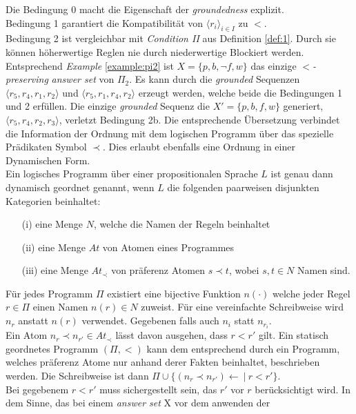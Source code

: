 Die Bedingung 0 macht die Eigenschaft der \emph{groundedness} explizit.\\
Bedingung 1 garantiert die Kompatibilität von $\langle r_i \rangle_{i \in I}$
zu $<$.\\
Bedingung 2 ist vergleichbar mit \emph{Condition II} aus Definition \ref{def:1}.
Durch sie können höherwertige Reglen nie durch niederwertige Blockiert werden.\\
Entsprechend \emph{Example} \ref{example:pi2} ist $X = \{p, b, \neg f, w\}$ das
einzige \emph{$<$-preserving} \emph{answer set} von $\Pi_2$. Es kann durch die 
\emph{grounded} Sequenzen
$\langle r_5, r_4, r_1, r_2 \rangle$ und $\langle r_5, r_1, r_4, r_2 \rangle$
erzeugt werden, welche beide die Bedingungen 1 und 2 erfüllen.
Die einzige \emph{grounded} Sequenz die $X' = \{p, b, f, w\}$ generiert,
$\langle r_5, r_4, r_2, r_3 \rangle$, verletzt Bedingung 2b.
Die entsprechende Übersetzung verbindet die Information der Ordnung
mit dem logischen Programm über das spezielle Prädikaten Symbol $\prec$.
Dies erlaubt ebenfalls eine Ordnung in einer Dynamischen Form.\\
Ein logisches Programm über einer propositionalen Sprache $L$ ist genau
dann dynamisch geordnet genannt, wenn $L$ die folgenden paarweisen disjunkten
Kategorien beinhaltet:
\begin{itemize}
  \item[(i)]   eine Menge $N$, welche die Namen der Regeln beinhaltet
  \item[(ii)]  eine Menge $At$ von Atomen eines Programmes
  \item[(iii)] eine Menge $At_{\prec}$ von präferenz Atomen $s \prec t$,
    wobei $s, t \in N$ Namen sind.
\end{itemize}
Für jedes Programm $\Pi$ existiert eine bijective Funktion $n(\cdot)$ welche jeder
Regel $r \in \Pi$ einen Namen $n(r) \in N$ zuweist.
Für eine vereinfachte Schreibweise wird $n_r$ anstatt $n(r)$ verwendet.
Gegebenen falls auch $n_i$ statt $n_{r_i}$.\\
Ein Atom $n_r \prec n_{r'} \in At_{\prec}$  lässt davon ausgehen, dass
$r < r'$ gilt.
Ein statisch geordnetes Programm $(\Pi, <)$ kann dem entsprechend durch ein
Programm, welches präferenz Atome nur anhand derer Fakten beinhaltet,
beschrieben werden. Die Schreibweise ist dann
$\Pi \cup \{(n_r \prec n_{r'}) \leftarrow~|~r < r'\}$.\\
Bei gegebenem $r < r'$ muss sichergestellt sein, das $r'$ vor $r$ berücksichtigt
wird. In dem Sinne, das bei einem \emph{answer set} X vor dem anwenden der
